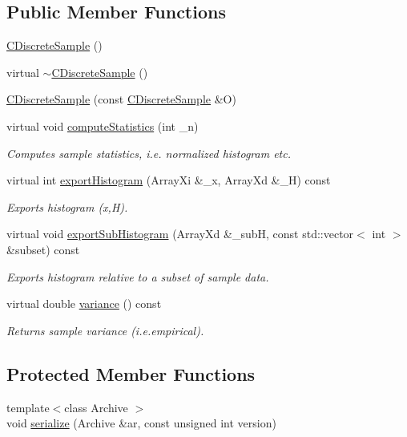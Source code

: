 \subsection*{Public Member Functions}
\begin{DoxyCompactItemize}
\item 
\hyperlink{class_c_discrete_sample_ac891c831c15bb1dbbf5cabd94862893c}{C\-Discrete\-Sample} ()
\item 
virtual \hyperlink{class_c_discrete_sample_a5e3dbd761477945ac08a622409c9efdb}{$\sim$\-C\-Discrete\-Sample} ()
\item 
\hyperlink{class_c_discrete_sample_ab658862e3edd371c03a791bfb187eb4c}{C\-Discrete\-Sample} (const \hyperlink{class_c_discrete_sample}{C\-Discrete\-Sample} \&O)
\item 
virtual void \hyperlink{class_c_discrete_sample_a35f047c74401f8a3b83ec024579d049c}{compute\-Statistics} (int \-\_\-n)
\begin{DoxyCompactList}\small\item\em Computes sample statistics, i.\-e. normalized histogram etc. \end{DoxyCompactList}\item 
virtual int \hyperlink{class_c_discrete_sample_aca5d068b16f23c329d05af382ab68807}{export\-Histogram} (Array\-Xi \&\-\_\-x, Array\-Xd \&\-\_\-\-H) const 
\begin{DoxyCompactList}\small\item\em Exports histogram (x,H). \end{DoxyCompactList}\item 
virtual void \hyperlink{class_c_discrete_sample_a59a5822c0311f42f7fe3538ea729fd70}{export\-Sub\-Histogram} (Array\-Xd \&\-\_\-sub\-H, const std\-::vector$<$ int $>$ \&subset) const 
\begin{DoxyCompactList}\small\item\em Exports histogram relative to a subset of sample data. \end{DoxyCompactList}\item 
virtual double \hyperlink{class_c_discrete_sample_a3e2d5a72842be01a167f890960a34bef}{variance} () const 
\begin{DoxyCompactList}\small\item\em Returns sample variance (i.\-e.\-empirical). \end{DoxyCompactList}\end{DoxyCompactItemize}
\subsection*{Protected Member Functions}
\begin{DoxyCompactItemize}
\item 
{\footnotesize template$<$class Archive $>$ }\\void \hyperlink{class_c_discrete_sample_aa3e70fbd99f76fc47705c08d6230b726}{serialize} (Archive \&ar, const unsigned int version)
\end{DoxyCompactItemize}
